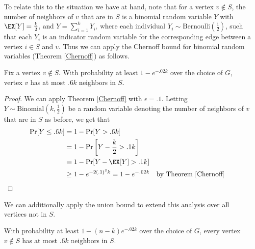 \documentclass{article}
\begin{document}
To relate this to the situation we have at hand, note that for a vertex $v \notin S$,
the number of neighbors of $v$ that are in $S$ is a binomial random variable $Y$ with
$\EX[Y] = \frac{k}{2}$, and $Y = \sum_{i = 1}^{k} Y_{i}$, where each individual
$Y_{i} \sim \text{Bernoulli}\left(\frac{1}{2}\right)$, such that each $Y_{i}$
is an indicator random variable for the corresponding edge between a vertex $i
\in S$ and $v$. Thus we can apply the Chernoff bound for binomial random
variables (Theorem \ref{Chernoff}) as follows.

\begin{corollary}
    \label{chernoff neighbors}
    Fix a vertex $v \notin S$. With probability at least $1 - e^{-.02k}$ over
    the choice of $G$, vertex $v$ has at most $.6k$ neighbors in $S$.
\end{corollary}

\begin{proof}
    We can apply Theorem \ref{Chernoff} with $\epsilon = .1$. Letting $Y \sim
    \text{Binomial}\left(k, \frac{1}{2}\right)$ be a
    random variable
    denoting the number of neighbors of $v$ that are in $S$ as before, we get that
    \begin{align*}
        \Pr[Y \leq .6k] &= 1 - \Pr[Y > .6k]
        \\
        &= 1 - \Pr\left[Y - \frac{k}{2} > .1k\right]
        \\
        &= 1 - \Pr[Y - \EX[Y] > .1k]
        \\
        &\geq 1 - e^{-2(.1)^{2}k} = 1 - e^{-.02k} & \text{by Theorem \ref{Chernoff}}
    \end{align*}
\end{proof}

We can additionally apply the union bound to extend this analysis over all vertices not
in $S$.

\begin{corollary}
    With probability at least $1 - (n - k) e^{-.02k}$ over the choice of $G$,
    every vertex $v \notin S$ has at most $.6k$ neighbors in $S$.
\end{corollary}
\end{document}
